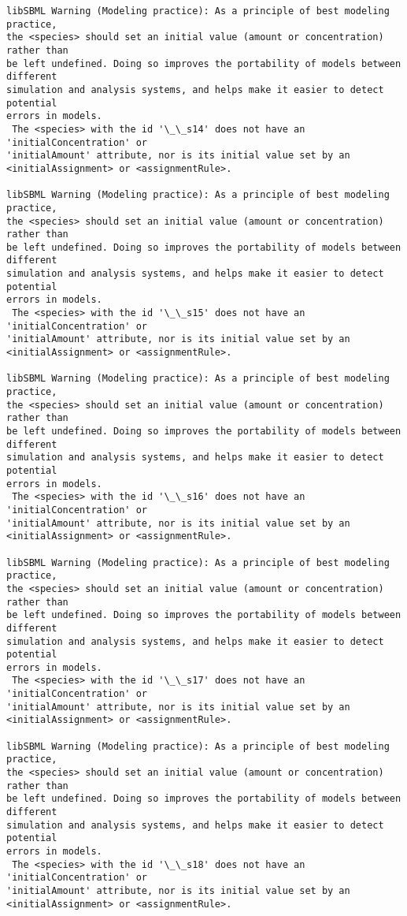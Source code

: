 \documentclass[11pt]{article}
\begin{document}
\begin{Verbatim}[commandchars=\\\{\}]
libSBML Warning (Modeling practice): As a principle of best modeling practice,
the <species> should set an initial value (amount or concentration) rather than
be left undefined. Doing so improves the portability of models between different
simulation and analysis systems, and helps make it easier to detect potential
errors in models.
 The <species> with the id '\_\_s14' does not have an 'initialConcentration' or
'initialAmount' attribute, nor is its initial value set by an
<initialAssignment> or <assignmentRule>.

libSBML Warning (Modeling practice): As a principle of best modeling practice,
the <species> should set an initial value (amount or concentration) rather than
be left undefined. Doing so improves the portability of models between different
simulation and analysis systems, and helps make it easier to detect potential
errors in models.
 The <species> with the id '\_\_s15' does not have an 'initialConcentration' or
'initialAmount' attribute, nor is its initial value set by an
<initialAssignment> or <assignmentRule>.

libSBML Warning (Modeling practice): As a principle of best modeling practice,
the <species> should set an initial value (amount or concentration) rather than
be left undefined. Doing so improves the portability of models between different
simulation and analysis systems, and helps make it easier to detect potential
errors in models.
 The <species> with the id '\_\_s16' does not have an 'initialConcentration' or
'initialAmount' attribute, nor is its initial value set by an
<initialAssignment> or <assignmentRule>.

libSBML Warning (Modeling practice): As a principle of best modeling practice,
the <species> should set an initial value (amount or concentration) rather than
be left undefined. Doing so improves the portability of models between different
simulation and analysis systems, and helps make it easier to detect potential
errors in models.
 The <species> with the id '\_\_s17' does not have an 'initialConcentration' or
'initialAmount' attribute, nor is its initial value set by an
<initialAssignment> or <assignmentRule>.

libSBML Warning (Modeling practice): As a principle of best modeling practice,
the <species> should set an initial value (amount or concentration) rather than
be left undefined. Doing so improves the portability of models between different
simulation and analysis systems, and helps make it easier to detect potential
errors in models.
 The <species> with the id '\_\_s18' does not have an 'initialConcentration' or
'initialAmount' attribute, nor is its initial value set by an
<initialAssignment> or <assignmentRule>.


\end{Verbatim}
\end{document}
